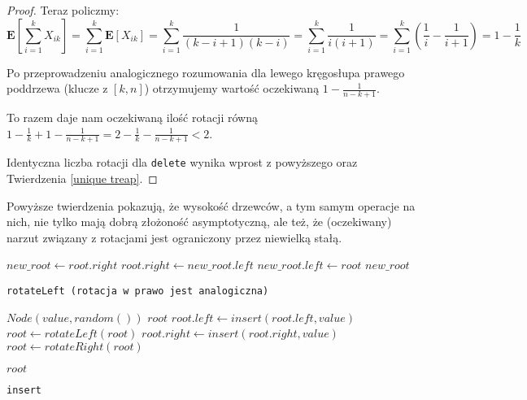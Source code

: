\begin{proof}
Teraz policzmy:
$$
\mathbf{E}[\sum_{i=1}^{k}X_{ik}]=
\sum_{i=1}^{k}\mathbf{E}[X_{ik}]=
\sum_{i=1}^{k}\frac{1}{(k-i+1)(k-i)}=
\sum_{i=1}^{k}\frac{1}{i(i+1)}=
\sum_{i=1}^{k}(\frac{1}{i}-\frac{1}{i+1})=
1-\frac{1}{k}
$$

Po przeprowadzeniu analogicznego rozumowania dla lewego kręgosłupa prawego poddrzewa (klucze z $[k,n]$) otrzymujemy wartość oczekiwaną $1 - \frac{1}{n-k+1}$.

To razem daje nam oczekiwaną ilość rotacji równą $1 - \frac{1}{k} + 1 - \frac{1}{n-k+1} = 2 -  \frac{1}{k} - \frac{1}{n-k+1} < 2$.

Identyczna liczba rotacji dla \texttt{delete} wynika wprost z powyższego oraz Twierdzenia \ref{unique treap}.
\end{proof}

Powyższe twierdzenia pokazują, że wysokość drzewców, a tym samym operacje na nich, nie tylko mają dobrą złożoność asymptotyczną, ale też, że (oczekiwany) narzut związany z rotacjami jest ograniczony przez niewielką stałą.

\newpage

\begin{algorithm}
  \DontPrintSemicolon


  $new\_root \leftarrow root.right$\;
  $root.right \leftarrow new\_root.left$\;
  $new\_root.left \leftarrow root$\;
  \Return $new\_root$\;
  
  \caption{\texttt{rotateLeft (rotacja w prawo jest analogiczna)}}
  \label{treap-rotate-left}
\end{algorithm}

\begin{algorithm}
  \DontPrintSemicolon

  {
    \Return $Node(value, random())$\;
  }
  {
    \Return $root$\;
  }
  {
    $root.left \leftarrow insert(root.left, value)$\;
    {
      $root \leftarrow rotateLeft(root)$\;
    }
  }
  {
    $root.right \leftarrow insert(root.right, value)$\;
    {
      $root \leftarrow rotateRight(root)$\;
    }
  }
  
  \Return $root$\;
  \caption{\texttt{insert}}
  \label{treap-insert}
\end{algorithm}

